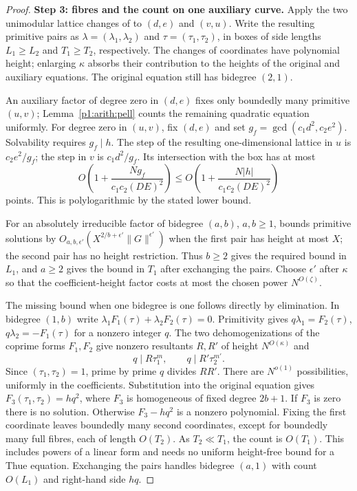 \begin{proof}
\medskip\noindent
\textbf{Step 3: fibres and the count on one auxiliary curve.}
Apply the two unimodular lattice changes of
\cite[Section~2.2]{reuss2014} to $(d,e)$ and $(v,u)$.
Write the resulting primitive pairs as $\lambda=(\lambda_1,\lambda_2)$
and $\tau=(\tau_1,\tau_2)$, in boxes of side lengths
$L_1\geq L_2$ and $T_1\geq T_2$, respectively.  The changes of
coordinates have polynomial height; enlarging $\kappa$ absorbs their
contribution to the heights of the original and auxiliary equations.
The original equation still has bidegree $(2,1)$.

An auxiliary factor of degree zero in $(d,e)$ fixes only boundedly
many primitive $(u,v)$; Lemma~\ref{p1:arith:pell} counts the remaining
quadratic equation uniformly.  For degree zero in $(u,v)$, fix $(d,e)$
and set $g_f=\gcd(c_1d^2,c_2e^2)$.  Solvability requires $g_f\mid h$.
The step of the resulting one-dimensional lattice in $u$ is
$c_2e^2/g_f$; the step in $v$ is $c_1d^2/g_f$.  Its intersection
with the box has at most
\[
 O\left(1+\frac{Ng_f}{c_1c_2(DE)^2}\right)
 \leq O\left(1+\frac{N|h|}{c_1c_2(DE)^2}\right)
\]
points.  This is polylogarithmic by the stated lower bound.

For an absolutely irreducible factor of bidegree $(a,b)$,
$a,b\geq1$, \cite[Lemma~2]{heathbrown2012} bounds primitive solutions by
$O_{a,b,\epsilon'}(X^{2/b+\epsilon'}\|G\|^{\epsilon'})$ when the
first pair has height at most $X$; the second pair has no height
restriction.  Thus $b\geq2$ gives the required bound in $L_1$, and
$a\geq2$ gives the bound in $T_1$ after exchanging the pairs.
Choose $\epsilon'$ after $\kappa$ so that the coefficient-height
factor costs at most the chosen power $N^{O(\zeta)}$.

The missing bound when one bidegree is one follows directly by
elimination.  In bidegree $(1,b)$ write
$\lambda_1F_1(\tau)+\lambda_2F_2(\tau)=0$.
Primitivity gives
$q\lambda_1=F_2(\tau)$, $q\lambda_2=-F_1(\tau)$ for a nonzero integer
$q$.  The two dehomogenizations of the coprime forms $F_1,F_2$ give
nonzero resultants $R,R'$ of height $N^{O(\kappa)}$ and
\[
 q\mid R\tau_1^m,\qquad q\mid R'\tau_2^{m'}.
\]
Since $(\tau_1,\tau_2)=1$, prime by prime $q$ divides $RR'$.
There are $N^{o(1)}$ possibilities, uniformly in the coefficients.
Substitution into the original equation gives
$F_3(\tau_1,\tau_2)=hq^2$, where $F_3$ is homogeneous of fixed degree
$2b+1$.  If $F_3$ is zero there is no solution.  Otherwise
$F_3-hq^2$ is a nonzero polynomial.  Fixing the first coordinate leaves
boundedly many second coordinates, except for boundedly many full
fibres, each of length $O(T_2)$.  As $T_2\ll T_1$, the count is
$O(T_1)$.  This includes powers of a linear form and needs no uniform
height-free bound for a Thue equation.  Exchanging the pairs handles
bidegree $(a,1)$ with count $O(L_1)$ and right-hand side $hq$.


\end{proof}
